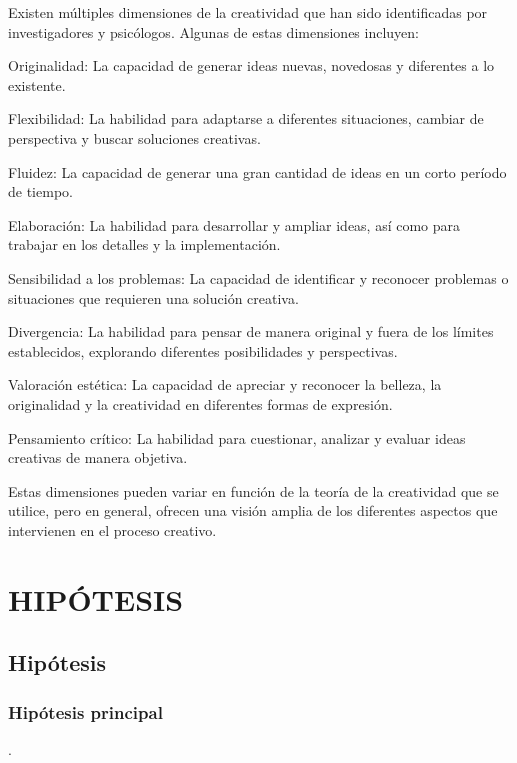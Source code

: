 \documentclass[12pt,a4paper]{article}
\begin{document}
Existen múltiples dimensiones de la creatividad que han sido identificadas por investigadores y psicólogos. Algunas de estas dimensiones incluyen:

Originalidad: La capacidad de generar ideas nuevas, novedosas y diferentes a lo existente.

Flexibilidad: La habilidad para adaptarse a diferentes situaciones, cambiar de perspectiva y buscar soluciones creativas.

Fluidez: La capacidad de generar una gran cantidad de ideas en un corto período de tiempo.

Elaboración: La habilidad para desarrollar y ampliar ideas, así como para trabajar en los detalles y la implementación.

Sensibilidad a los problemas: La capacidad de identificar y reconocer problemas o situaciones que requieren una solución creativa.

Divergencia: La habilidad para pensar de manera original y fuera de los límites establecidos, explorando diferentes posibilidades y perspectivas.

Valoración estética: La capacidad de apreciar y reconocer la belleza, la originalidad y la creatividad en diferentes formas de expresión.

Pensamiento crítico: La habilidad para cuestionar, analizar y evaluar ideas creativas de manera objetiva.

Estas dimensiones pueden variar en función de la teoría de la creatividad que se utilice, pero en general, ofrecen una visión amplia de los diferentes aspectos que intervienen en el proceso creativo.





\flushbottom \printglossary[numberedsection,nonumberlist,title=Definiciones  de términos básicos]




\section{HIPÓTESIS}
\subsection{Hipótesis}
\subsubsection{Hipótesis principal}
\hipotesis.
\end{document}
